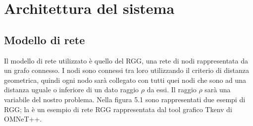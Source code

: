 \chapter{Architettura del sistema}
\label{chap:architettura}

\section{Modello di rete}
Il modello di rete utilizzato è quello del \acf{RGG}, una rete di nodi rappresentata da un grafo connesso. I nodi sono connessi tra loro utilizzando il criterio di distanza geometrica, quindi ogni nodo sarà collegato con tutti quei nodi che sono ad una distanza uguale o inferiore di un dato raggio $\rho$ da essi. Il raggio $\rho$ sarà una variabile del nostro problema. Nella figura 5.1 sono rappresentati due esempi di \acs{RGG}; la  è un esempio di rete \acs{RGG} rappresentata dal tool grafico Tkenv di OMNeT++.
\medskip

